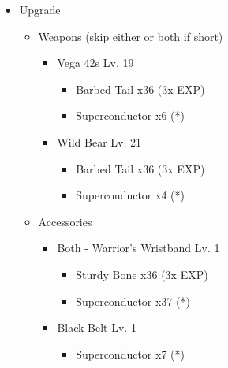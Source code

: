 \vfill
\begin{upgrade}
		\begin{itemize}
			\item Upgrade
			      \begin{itemize}
				      \item Weapons (skip either or both if short)
				            \begin{itemize}
					            \item Vega 42s Lv. 19
					                  \begin{itemize}
						                  \item Barbed Tail x36 (3x EXP)
						                  \item Superconductor x6 (*)
					                  \end{itemize}
					            \item Wild Bear Lv. 21
					                  \begin{itemize}
						                  \item Barbed Tail x36 (3x EXP)
						                  \item Superconductor x4 (*)
					                  \end{itemize}
				            \end{itemize}
				      \item Accessories
				            \begin{itemize}
					            \item Both - Warrior's Wristband Lv. 1
					                  \begin{itemize}
						                  \item Sturdy Bone x36 (3x EXP)
						                  \item Superconductor x37 (*)
					                  \end{itemize}
					            \item Black Belt Lv. 1
					                  \begin{itemize}
						                  \item Superconductor x7 (*)
					                  \end{itemize}
				            \end{itemize}
			      \end{itemize}
		\end{itemize}
\end{upgrade}
